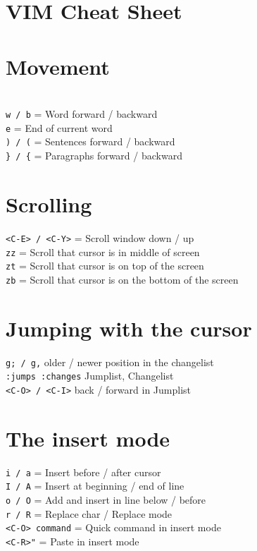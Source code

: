 \documentclass[10pt,DIV=50,landscape,pagesize,parskip=off]{scrartcl}
\newcommand\co[1]{\texttt{#1}}
\newcommand\coe[2]{\co{#1} = #2}
\begin{document}
\section*{{\Huge {}VIM Cheat Sheet}}
\begin{multicols}{3}
\section{Movement}
\\
\coe{w / b}{Word forward / backward}\\
\coe{e}{End of current word}\\
\coe{) / (}{Sentences forward / backward}\\
\coe{\} / \{}{Paragraphs forward / backward}

\section{Scrolling}
\coe{<C-E> / <C-Y>}{Scroll window down / up}\\
\coe{zz}{Scroll that cursor is in middle of screen}\\
\coe{zt}{Scroll that cursor is on top of the screen}\\
\coe{zb}{Scroll that cursor is on the bottom of the screen}

\section{Jumping with the cursor}
\lstinline|g; / g,| older / newer position in the changelist \\
\lstinline|:jumps :changes| Jumplist, Changelist\\
\lstinline|<C-O> / <C-I>| back / forward in Jumplist


\section{The insert mode}
\coe{i / a}{Insert before / after cursor}\\
\coe{I / A}{Insert at beginning / end of line}\\
\coe{o / O}{Add and insert in line below / before}\\
\coe{r / R}{Replace char / Replace mode} \\
\lstinline|<C-O> command| = Quick command in insert mode \\
\lstinline|<C-R>"| = Paste in insert mode


\end{multicols}
\end{document}
